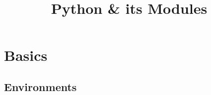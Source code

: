 \documentclass[onecolumn]{IEEEtran} %
\begin{document}
\title{Python \& its Modules}
\maketitle

\newcommand{\beq}{\begin{equation}}
\newcommand{\eeq}{\end{equation}}
\newcommand{\bi}{\begin{itemize}}
\newcommand{\ei}{\end{itemize}}

\tableofcontents

\section{Basics}
\subsection{Environments}
\end{document}
